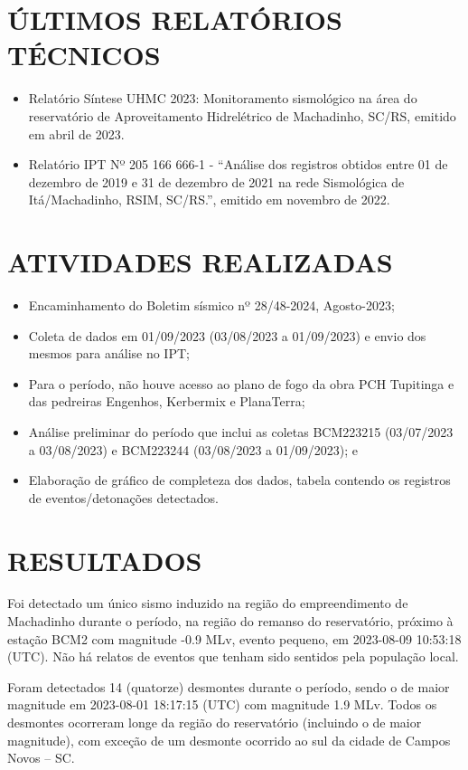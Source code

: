\pagestyle{geral}
\section{ÚLTIMOS RELATÓRIOS TÉCNICOS}
\label{sec:ultimos_relatorios}
\begin{itemize}
    \item Relatório Síntese UHMC 2023: Monitoramento sismológico na área do reservatório de Aproveitamento Hidrelétrico de Machadinho, SC/RS, emitido em abril de 2023.
    \item Relatório IPT Nº 205 166 666-1 - “Análise dos registros obtidos entre 01 de dezembro de 2019 e 31 de dezembro de 2021 na rede Sismológica de Itá/Machadinho, RSIM, SC/RS.”, emitido em novembro de 2022.
\end{itemize}

\section{ATIVIDADES REALIZADAS}
\label{sec:atividade}
\begin{itemize}
    \item Encaminhamento do Boletim sísmico nº 28/48-2024, Agosto-2023;
    \item Coleta de dados em 01/09/2023 (03/08/2023 a 01/09/2023) e envio dos mesmos para análise no IPT;
    \item Para o período, não houve acesso ao plano de fogo da obra PCH Tupitinga e das pedreiras Engenhos, Kerbermix e PlanaTerra;
    \item Análise preliminar do período que inclui as coletas BCM223215 (03/07/2023 a 03/08/2023) e BCM223244 (03/08/2023 a 01/09/2023); e
    \item Elaboração de gráfico de completeza dos dados, tabela contendo os registros de eventos/detonações detectados.
\end{itemize}

\section{RESULTADOS}
\label{sec:resultados}
Foi detectado um único sismo induzido na região do empreendimento de Machadinho durante o período, na região do remanso do reservatório, próximo à estação BCM2 com magnitude -0.9 MLv, evento pequeno, em 2023-08-09 10:53:18 (UTC). Não há relatos de eventos que tenham sido sentidos pela população local.

Foram detectados 14 (quatorze) desmontes durante o período, sendo o de maior magnitude em 2023-08-01 18:17:15 (UTC) com magnitude 1.9 MLv. Todos os desmontes ocorreram longe da região do reservatório (incluindo o de maior magnitude), com exceção de um desmonte ocorrido ao sul da cidade de Campos Novos – SC.

